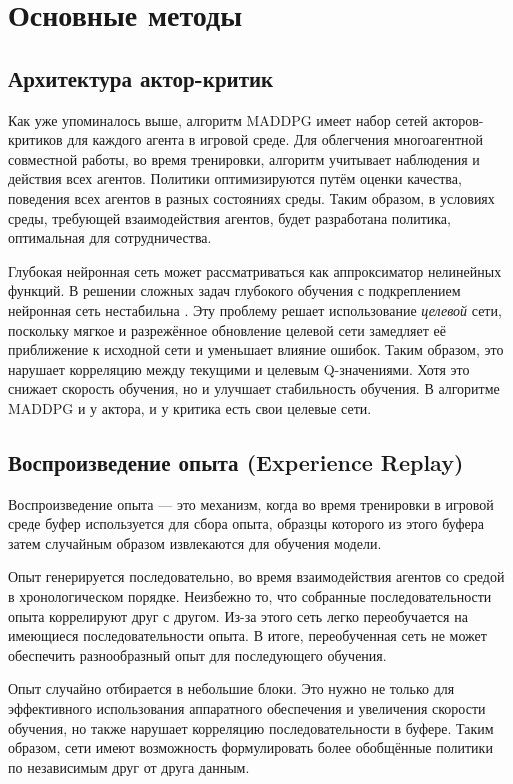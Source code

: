 \section{Основные методы}

\subsection{Архитектура актор-критик}

Как уже упоминалось выше, алгоритм MADDPG имеет набор сетей акторов-критиков для каждого агента в игровой среде. Для облегчения многоагентной совместной работы, во время тренировки, алгоритм учитывает наблюдения и действия всех агентов. Политики оптимизируются путём оценки качества, поведения всех агентов в разных состояниях среды. Таким образом, в условиях среды, требующей взаимодействия агентов, будет разработана политика, оптимальная для сотрудничества.

Глубокая нейронная сеть может рассматриваться как аппроксиматор нелинейных функций. В решении сложных задач глубокого обучения с подкреплением нейронная сеть нестабильна \cite{lillicrap2015continuous}. Эту проблему решает использование \textit{целевой} сети, поскольку мягкое и разрежённое обновление целевой сети замедляет её приближение к исходной сети и уменьшает влияние ошибок. Таким образом, это нарушает корреляцию между текущими и целевым Q-значениями. Хотя это снижает скорость обучения, но и улучшает стабильность обучения. В алгоритме MADDPG и у актора, и у критика есть свои целевые сети.

\subsection{Воспроизведение опыта (Experience Replay)}

Воспроизведение опыта — это механизм, когда во время тренировки в игровой среде буфер используется для сбора опыта, образцы которого из этого буфера затем случайным образом извлекаются для обучения модели.

Опыт генерируется последовательно, во время взаимодействия агентов со средой в хронологическом порядке. Неизбежно то, что собранные последовательности опыта коррелируют друг с другом. Из-за этого сеть легко переобучается на имеющиеся последовательности опыта. В итоге, переобученная сеть не может обеспечить разнообразный опыт для последующего обучения.

Опыт случайно отбирается в небольшие блоки. Это нужно не только для эффективного использования аппаратного обеспечения и увеличения скорости обучения, но также нарушает корреляцию последовательности в буфере. Таким образом, сети имеют возможность формулировать более обобщённые политики по независимым друг от друга данным.

